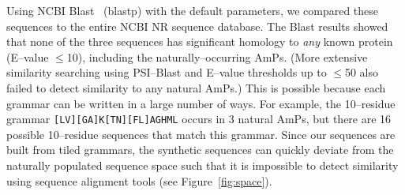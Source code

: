 



    Using NCBI Blast~\cite{altschul1997gapped} (blastp) with the default
    parameters, we compared these sequences to the entire NCBI NR
    sequence database.  The Blast results showed that none of the three
    sequences has significant homology to \emph{any} known protein
    (E--value $\leq$10), including the naturally--occurring AmPs.
    (More extensive similarity searching using PSI--Blast and E--value
    thresholds up to $\leq$50 also failed to detect similarity to any
    natural AmPs.)  This is possible because each grammar can be written
    in a large number of ways.  For example, the 10--residue grammar
    \texttt{[LV][GA]K[TN][FL]AGHML} occurs in 3 natural AmPs, but there
    are 16 possible 10--residue sequences that match this grammar.
    Since our sequences are built from tiled grammars, the synthetic
    sequences can quickly deviate from the naturally populated sequence
    space such that it is impossible to detect similarity using sequence
    alignment tools (see Figure~\vref{fig:space}).



